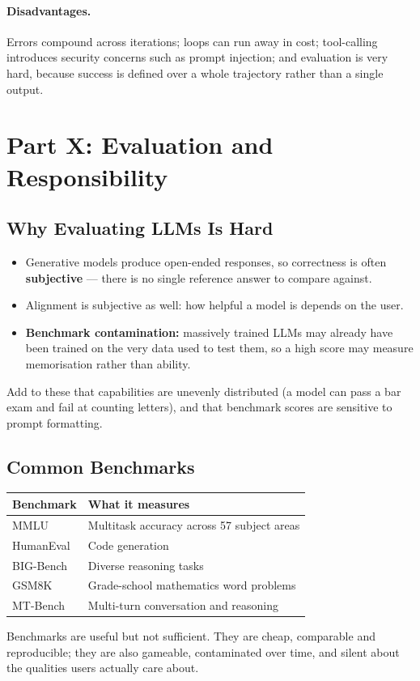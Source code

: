 \documentclass[11pt,a4paper]{article}
\begin{document}
\paragraph{Disadvantages.} Errors compound across iterations; loops can run away in cost;
tool-calling introduces security concerns such as prompt injection; and evaluation is very
hard, because success is defined over a whole trajectory rather than a single output.

\section{Part X: Evaluation and Responsibility}
\label{sec:eval}

\subsection{Why Evaluating LLMs Is Hard}

\begin{itemize}
\item Generative models produce open-ended responses, so correctness is often \textbf{subjective}
  --- there is no single reference answer to compare against.
\item Alignment is subjective as well: how helpful a model is depends on the user.
\item \textbf{Benchmark contamination:} massively trained LLMs may already have been trained
  on the very data used to test them, so a high score may measure memorisation rather than
  ability.
\end{itemize}
Add to these that capabilities are unevenly distributed (a model can pass a bar exam and fail
at counting letters), and that benchmark scores are sensitive to prompt formatting.

\subsection{Common Benchmarks}

\begin{center}
\begin{tabularx}{\textwidth}{lY}
\textbf{Benchmark} & \textbf{What it measures} \\
\hline
MMLU & Multitask accuracy across 57 subject areas \\
HumanEval & Code generation \\
BIG-Bench & Diverse reasoning tasks \\
GSM8K & Grade-school mathematics word problems \\
MT-Bench & Multi-turn conversation and reasoning \\
\end{tabularx}
\end{center}
Benchmarks are useful but not sufficient. They are cheap, comparable and reproducible; they
are also gameable, contaminated over time, and silent about the qualities users actually care
about.
\end{document}
